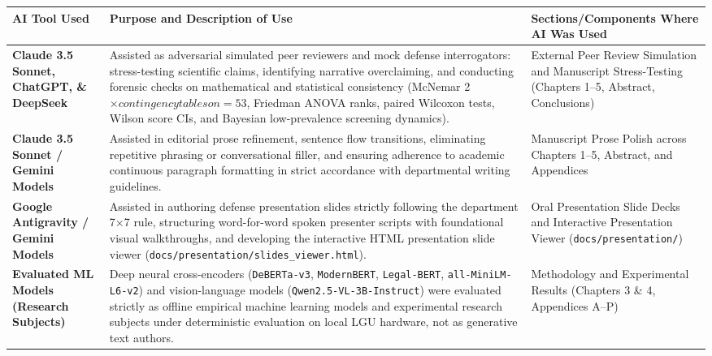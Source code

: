 \documentclass[11pt,letterpaper]{article}
\begin{document}
  \newpage %

  \vspace*{0.05cm}
  \fontsize{8.5pt}{11pt}\selectfont
  \begin{tabularx}{\textwidth}{@{}>{\raggedright\arraybackslash}p{2.8cm} X >{\raggedright\arraybackslash}p{4.2cm}@{}}
    \textbf{AI Tool Used} & \textbf{Purpose and Description of Use} & \textbf{Sections/Components Where AI Was Used} \\[3pt]
    \midrule
    \textbf{Claude 3.5 Sonnet, ChatGPT, \& DeepSeek} &
    Assisted as adversarial simulated peer reviewers and mock defense interrogators: stress-testing scientific claims, identifying narrative overclaiming, and conducting forensic checks on mathematical and statistical consistency (McNemar 2$\times contingency tables on =53$, Friedman ANOVA ranks, paired Wilcoxon tests, Wilson score CIs, and Bayesian low-prevalence screening dynamics). &
    External Peer Review Simulation and Manuscript Stress-Testing (Chapters 1--5, Abstract, Conclusions) \\[3pt]

    \textbf{Claude 3.5 Sonnet / Gemini Models} &
    Assisted in editorial prose refinement, sentence flow transitions, eliminating repetitive phrasing or conversational filler, and ensuring adherence to academic continuous paragraph formatting in strict accordance with departmental writing guidelines. &
    Manuscript Prose Polish across Chapters 1--5, Abstract, and Appendices \\[3pt]

    \textbf{Google Antigravity / Gemini Models} &
    Assisted in authoring defense presentation slides strictly following the department 7$\times$7 rule, structuring word-for-word spoken presenter scripts with foundational visual walkthroughs, and developing the interactive HTML presentation slide viewer (\texttt{docs/presentation/slides\_viewer.html}). &
    Oral Presentation Slide Decks and Interactive Presentation Viewer (\texttt{docs/presentation/}) \\[3pt]
    
    \textbf{Evaluated ML Models (Research Subjects)} &
    Deep neural cross-encoders (\texttt{DeBERTa-v3}, \texttt{ModernBERT}, \texttt{Legal-BERT}, \texttt{all-MiniLM-L6-v2}) and vision-language models (\texttt{Qwen2.5-VL-3B-Instruct}) were evaluated strictly as offline empirical machine learning models and experimental research subjects under deterministic evaluation on local LGU hardware, not as generative text authors. &
    Methodology and Experimental Results (Chapters 3 \& 4, Appendices A--P) \\[2pt]
  \end{tabularx}
\end{document}
